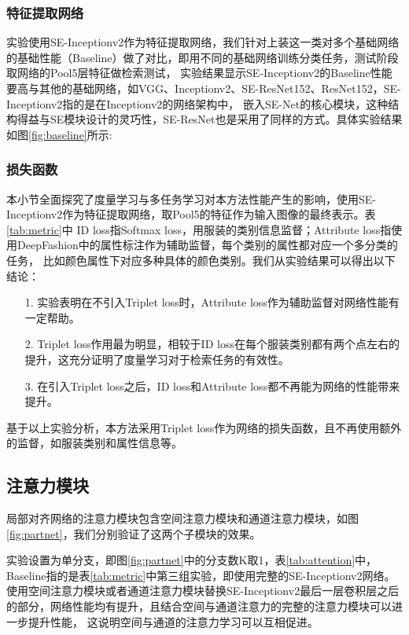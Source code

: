 \subsubsection{特征提取网络}
实验使用SE-Inceptionv2作为特征提取网络，我们针对上装这一类对多个基础网络的基础性能（Baseline）做了对比，即用不同的基础网络训练分类任务，测试阶段取网络的Pool5层特征做检索测试，
实验结果显示SE-Inceptionv2的Baseline性能要高与其他的基础网络，如VGG、Inceptionv2、SE-ResNet152、ResNet152，SE-Inceptionv2指的是在Inceptionv2的网络架构中，
嵌入SE-Net的核心模块，这种结构得益与SE模块设计的灵巧性，SE-ResNet也是采用了同样的方式。具体实验结果如图\ref{fig:baseline}所示:


\subsubsection{损失函数}
本小节全面探究了度量学习与多任务学习对本方法性能产生的影响，使用SE-Inceptionv2作为特征提取网络，取Pool5的特征作为输入图像的最终表示。表\ref{tab:metric}中
ID loss指Softmax loss，用服装的类别信息监督；Attribute loss指使用DeepFashion中的属性标注作为辅助监督，每个类别的属性都对应一个多分类的任务，
比如颜色属性下对应多种具体的颜色类别。我们从实验结果可以得出以下结论：

\begin{itemize}
  \item[1.]实验表明在不引入Triplet loss时，Attribute loss作为辅助监督对网络性能有一定帮助。
  \item[2.]Triplet loss作用最为明显，相较于ID loss在每个服装类别都有两个点左右的提升，这充分证明了度量学习对于检索任务的有效性。
  \item[3.]在引入Triplet loss之后，ID loss和Attribute loss都不再能为网络的性能带来提升。
\end{itemize}
基于以上实验分析，本方法采用Triplet loss作为网络的损失函数，且不再使用额外的监督，如服装类别和属性信息等。
\subsection{注意力模块}
局部对齐网络的注意力模块包含空间注意力模块和通道注意力模块，如图\ref{fig:partnet}，我们分别验证了这两个子模块的效果。

实验设置为单分支，即图\ref{fig:partnet}中的分支数K取1，表\ref{tab:attention}中，Baseline指的是表\ref{tab:metric}中第三组实验，即使用完整的SE-Inceptionv2网络。
使用空间注意力模块或者通道注意力模块替换SE-Inceptionv2最后一层卷积层之后的部分，网络性能均有提升，且结合空间与通道注意力的完整的注意力模块可以进一步提升性能，
这说明空间与通道的注意力学习可以互相促进。
